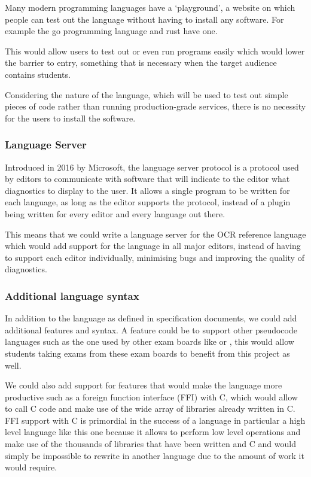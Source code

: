\documentclass{article}
\begin{document}
Many modern programming languages have a `playground', a website on which
people can test out the language without having to install any software. For
example the go programming language and rust have one\cite{rustPlayground,
goPlayground}.

This would allow users to test out or even run programs easily which would
lower the barrier to entry, something that is necessary when the target
audience contains students.

Considering the nature of the language, which will be used to test out simple
pieces of code rather than running production-grade services, there is no
necessity for the users to install the software.

\subsubsection{Language Server}

Introduced in 2016 by Microsoft, the language server protocol is a protocol
used by editors to communicate with software that will indicate to the editor
what diagnostics to display to the user. It allows a single program to be
written for each language, as long as the editor supports the protocol, instead
of a plugin being written for every editor and every language out there.

This means that we could write a language server for the OCR reference language
which would add support for the language in all major editors, instead of
having to support each editor individually, minimising bugs and improving the
quality of diagnostics.

\subsubsection{Additional language syntax}

In addition to the language as defined in specification documents, we could add
additional features and syntax. A feature could be to support other pseudocode
languages such as the one used by other exam boards like \textcite{aqaCS} or
\textcite{wjecCS}, this would allow students taking exams from these exam
boards to benefit from this project as well.

We could also add support for features that would make the language more
productive such as a foreign function interface (FFI) with C, which would allow
to call C code and make use of the wide array of libraries already written in
C. FFI support with C is primordial in the success of a language in particular
a high level language like this one because it allows to perform low level
operations and make use of the thousands of libraries that have been written
and C and would simply be impossible to rewrite in another language due to the
amount of work it would require.
\end{document}
